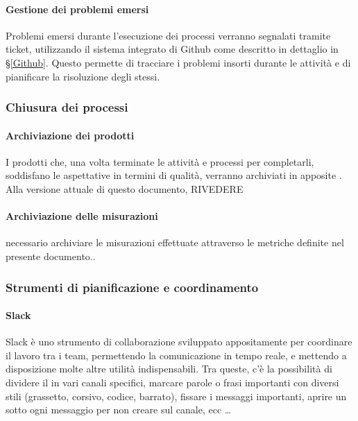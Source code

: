     		\paragraph{Gestione dei problemi emersi}
			Problemi emersi durante l'esecuzione dei processi verranno segnalati tramite ticket, utilizzando il sistema integrato di Github come descritto
			in dettaglio in \S\ref{Github}. Questo permette di tracciare i problemi insorti durante le attività e di pianificare la risoluzione degli stessi.


		\subsubsection{Chiusura dei processi}

    		\paragraph{Archiviazione dei prodotti}
			I prodotti che, una volta terminate le attività e processi per completarli, soddisfano le aspettative in termini di qualità,
			verranno archiviati in apposite . Alla versione attuale di questo documento, RIVEDERE

    		\paragraph{Archiviazione delle misurazioni} %
    		necessario archiviare le misurazioni effettuate attraverso le metriche definite nel presente documento..

    	\subsubsection{Strumenti di pianificazione e coordinamento}\label{pianificazione e coordinamento}

    		\paragraph{Slack} %
			Slack è uno strumento di collaborazione sviluppato appositamente per coordinare il lavoro tra i team, permettendo la comunicazione in tempo
			reale, e mettendo a disposizione molte altre utilità indispensabili. Tra queste, c'è la possibilità di dividere il  in vari canali
			specifici, marcare parole o frasi importanti con diversi stili (grassetto, corsivo, codice, barrato), fissare i messaggi importanti, aprire un 
			sotto ogni messaggio per non creare  sul canale, ecc \dots

